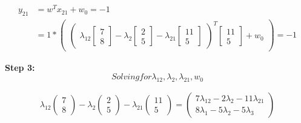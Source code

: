 \documentclass[12pt]{report}
\begin{document}
\begin{equation*}
	\begin{aligned}
		y_{21} & =  w^T x_{21} + w_{0} = -1              \\
		       & = 1 * \begin{pmatrix}
			               \begin{pmatrix}
				\lambda_{12}\begin{bmatrix}
					            7 \\
					            8
				            \end{bmatrix} -

				\lambda_{2}\begin{bmatrix}
					           2 \\
					           5
				           \end{bmatrix} -

				\lambda_{21}\begin{bmatrix}
					            11 \\
					            5
				            \end{bmatrix}
			\end{pmatrix}  ^ T
			               \begin{bmatrix}
				11 \\
				5
			\end{bmatrix} + w_{0}
		               \end{pmatrix} = -1
	\end{aligned}
\end{equation*}

\textbf{Step 3:}
\begin{equation*}
	Solving for \lambda_{12}, \lambda_{2}, \lambda_{21}, w_{0}
\end{equation*}


\begin{equation*}
	\begin{aligned}
		\lambda_{12}\begin{pmatrix}7 \\ 8\end{pmatrix}-\lambda_{2}\begin{pmatrix}2\\ 5\end{pmatrix}-\lambda_{21}\begin{pmatrix}11\\ 5\end{pmatrix}=\begin{pmatrix}7\lambda_{12}-2\lambda_{2}-11\lambda_{21}\\ 8\lambda_{1}-5\lambda_{2}-5\lambda_{3}\end{pmatrix}
	\end{aligned}
\end{equation*}
\end{document}
